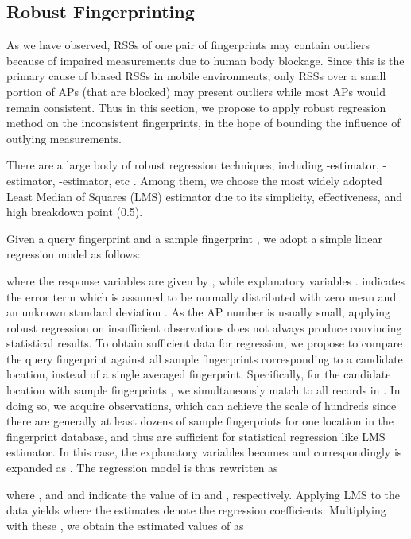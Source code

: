 \documentclass[10pt,conference,compsocconf,letterpaper]{./sty/IEEEtran}
\newcommand{\rev}[1]{{\color{blue}#1}} \newcommand{\com}[1]{\textbf{\color{red}(COMMENT: #1)}} \else
\newcommand{\rev}[1]{#1}
\newcommand{\com}[1]{}
\begin{document}
\subsection{Robust Fingerprinting}

As we have observed, RSSs of one pair of fingerprints may contain outliers because of impaired measurements due to human body blockage. Since this is the primary cause of biased RSSs in mobile environments, only RSSs over a small portion of APs (that are blocked) may present outliers while most APs would remain consistent. Thus in this section, we propose to apply robust regression method on the inconsistent fingerprints, in the hope of bounding the influence of outlying measurements.





There are a large body of robust regression techniques, including -estimator, -estimator, -estimator, etc \cite{rousseeuw2005robust}. Among them, we choose the most widely adopted Least Median of Squares (LMS) \cite{rousseeuw1984least} estimator due to its simplicity, effectiveness, and high breakdown point (0.5).

Given a query fingerprint  and a sample fingerprint , we adopt a simple linear regression model as follows:

where the response variables  are given by , while explanatory variables .  indicates the error term which is assumed to be normally distributed with zero mean and an unknown standard deviation . 
As the AP number  is usually small, applying robust regression on insufficient observations does not always produce convincing statistical results. To obtain sufficient data for regression, we propose to compare the query fingerprint against all sample fingerprints corresponding to a candidate location, instead of a single averaged fingerprint. Specifically, for the candidate location  with sample fingerprints , we simultaneously match  to all records in . 
In doing so, we acquire  observations, which can achieve the scale of hundreds since there are generally at least dozens of sample fingerprints for one location in the fingerprint database, and thus are \rev{sufficient} for statistical regression like LMS estimator. In this case, the explanatory variables  becomes  and correspondingly  is expanded as . The regression model is thus rewritten as

where , and  and  indicate the value of  in  and , respectively. 
Applying LMS to the data  yields  where the estimates  denote the regression coefficients. Multiplying  with these , we obtain the estimated values of  as
\end{document}
